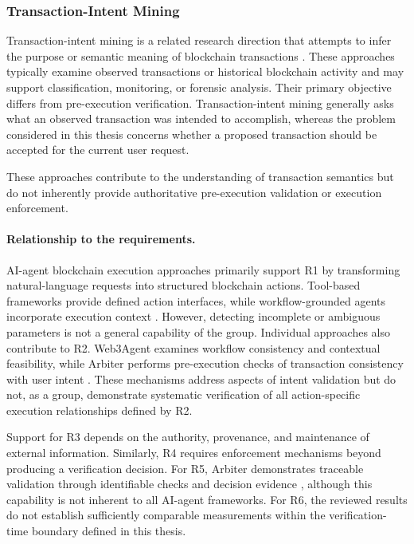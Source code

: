 \subsubsection{Transaction-Intent Mining}

Transaction-intent mining is a related research direction
that attempts to infer the purpose or semantic meaning
of blockchain transactions
\cite{TODO_TransactionIntentMining}. These approaches
typically examine observed transactions or historical
blockchain activity and may support classification,
monitoring, or forensic analysis. Their primary objective differs from pre-execution
verification. Transaction-intent mining generally asks
what an observed transaction was intended to accomplish,
whereas the problem considered in this thesis concerns
whether a proposed transaction should be accepted for
the current user request.

These approaches contribute to the understanding of
transaction semantics but do not inherently provide
authoritative pre-execution validation or execution
enforcement.

\paragraph{Relationship to the requirements.}

AI-agent blockchain execution approaches primarily support
R1 by transforming natural-language requests into structured
blockchain actions. Tool-based frameworks provide defined
action interfaces, while workflow-grounded agents incorporate
execution context \cite{coinbaseAgentKit2026,TODO_Web3Agent}.
However, detecting incomplete or ambiguous parameters is
not a general capability of the group. Individual approaches also contribute to R2. Web3Agent
examines workflow consistency and contextual feasibility,
while Arbiter performs pre-execution checks of transaction
consistency with user intent
\cite{TODO_Web3Agent,TODO_Arbiter2026}.
These mechanisms address aspects of intent validation but
do not, as a group, demonstrate systematic verification of
all action-specific execution relationships defined by R2.

Support for R3 depends on the authority, provenance, and
maintenance of external information. Similarly, R4 requires
enforcement mechanisms beyond producing a verification
decision. For R5, Arbiter demonstrates traceable validation
through identifiable checks and decision evidence
\cite{TODO_Arbiter2026}, although this capability is not
inherent to all AI-agent frameworks. For R6, the reviewed
results do not establish sufficiently comparable measurements
within the verification-time boundary defined in this thesis.


